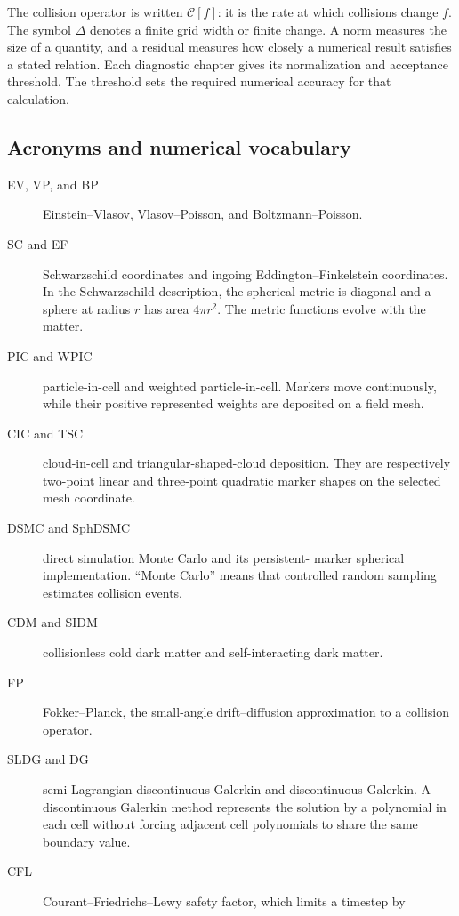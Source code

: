 The collision operator is written \(\mathcal C[f]\): it is the rate at which
collisions change \(f\).  The symbol \(\Delta\) denotes a finite grid width or
finite change. A norm measures the size of a quantity, and a residual measures
how closely a numerical result satisfies a stated relation. Each diagnostic
chapter gives its normalization and acceptance threshold. The threshold sets
the required numerical accuracy for that calculation.

\subsection{Acronyms and numerical vocabulary}

\begin{description}
\item[EV, VP, and BP] Einstein--Vlasov, Vlasov--Poisson, and
      Boltzmann--Poisson.
\item[SC and EF] Schwarzschild coordinates and ingoing
      Eddington--Finkelstein coordinates.  In the Schwarzschild description,
      the spherical metric is diagonal and a sphere at radius \(r\) has
      area \(4\pi r^2\).  The metric functions evolve with the matter.
\item[PIC and WPIC] particle-in-cell and weighted particle-in-cell.  Markers
      move continuously, while their positive represented weights are
      deposited on a field mesh.
\item[CIC and TSC] cloud-in-cell and triangular-shaped-cloud deposition.  They
      are respectively two-point linear and three-point quadratic marker
      shapes on the selected mesh coordinate.
\item[DSMC and SphDSMC] direct simulation Monte Carlo and its persistent-
      marker spherical implementation.  ``Monte Carlo'' means that controlled
      random sampling estimates collision events.
\item[CDM and SIDM] collisionless cold dark matter and self-interacting dark
      matter.
\item[FP] Fokker--Planck, the small-angle drift--diffusion approximation to a
      collision operator.
\item[SLDG and DG] semi-Lagrangian discontinuous Galerkin and discontinuous
      Galerkin.  A discontinuous Galerkin method represents the solution by a
      polynomial in each cell without forcing adjacent cell polynomials to
      share the same boundary value.
\item[CFL] Courant--Friedrichs--Lewy safety factor, which limits a timestep by

\end{description}
